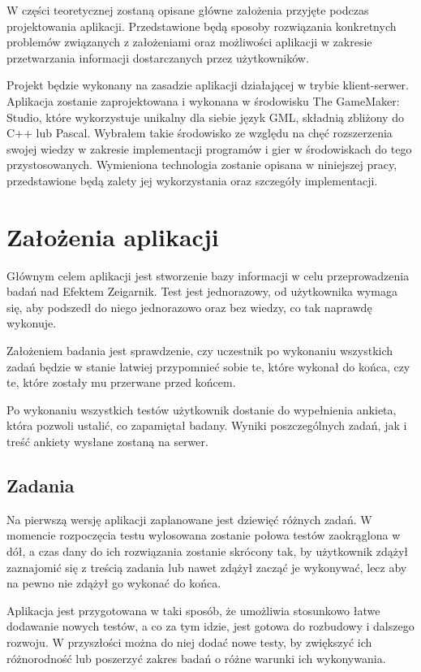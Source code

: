 \documentclass[openright]{xmgr}
\begin{document}
W części teoretycznej zostaną opisane główne założenia przyjęte podczas projektowania aplikacji. Przedstawione będą sposoby rozwiązania konkretnych problemów związanych z założeniami oraz możliwości aplikacji w zakresie przetwarzania informacji dostarczanych przez użytkowników.

Projekt będzie wykonany na zasadzie aplikacji działającej w trybie klient-serwer. Aplikacja zostanie zaprojektowana i wykonana w środowisku The GameMaker: Studio, które wykorzystuje unikalny dla siebie język GML, składnią zbliżony do C++ lub Pascal. Wybrałem takie środowisko ze względu na chęć rozszerzenia swojej wiedzy w zakresie implementacji programów i gier w środowiskach do tego przystosowanych. Wymieniona technologia zostanie opisana w niniejszej pracy, przedstawione będą zalety jej wykorzystania oraz szczegóły implementacji.




\chapter{Założenia aplikacji}
Głównym celem aplikacji jest stworzenie bazy informacji w celu przeprowadzenia badań nad Efektem Zeigarnik. Test jest jednorazowy, od użytkownika wymaga się, aby podszedł do niego jednorazowo oraz bez wiedzy, co tak naprawdę wykonuje.

Założeniem badania jest sprawdzenie, czy uczestnik po wykonaniu wszystkich zadań będzie w stanie łatwiej przypomnieć sobie te, które wykonał do końca, czy te, które zostały mu przerwane przed końcem.

Po wykonaniu wszystkich testów użytkownik dostanie do wypełnienia ankieta, która pozwoli ustalić, co zapamiętał badany. Wyniki poszczególnych zadań, jak i treść ankiety wysłane zostaną na serwer.

\section{Zadania}
Na pierwszą wersję aplikacji zaplanowane jest dziewięć różnych zadań. W momencie rozpoczęcia testu wylosowana zostanie połowa testów zaokrąglona w dół, a czas dany do ich rozwiązania zostanie skrócony tak, by użytkownik zdążył zaznajomić się z treścią zadania lub nawet zdążył zacząć je wykonywać, lecz aby na pewno nie zdążył go wykonać do końca.

Aplikacja jest przygotowana w taki sposób, że umożliwia stosunkowo łatwe dodawanie nowych testów, a co za tym idzie, jest gotowa do rozbudowy i dalszego rozwoju. W przyszłości można do niej dodać nowe testy, by zwiększyć ich różnorodność lub poszerzyć zakres badań o różne warunki ich wykonywania.
 
\end{document}
